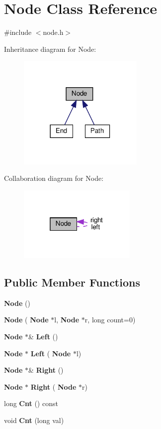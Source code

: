 \section{Node Class Reference}
\label{class_node}


{\ttfamily \#include $<$node.\+h$>$}



Inheritance diagram for Node\+:
\nopagebreak
\begin{figure}[H]
\begin{center}
\leavevmode
\includegraphics[width=170pt]{class_node__inherit__graph}
\end{center}
\end{figure}


Collaboration diagram for Node\+:
\nopagebreak
\begin{figure}[H]
\begin{center}
\leavevmode
\includegraphics[width=160pt]{class_node__coll__graph}
\end{center}
\end{figure}
\subsection*{Public Member Functions}
\begin{DoxyCompactItemize}
\item 
\textbf{ Node} ()
\item 
\textbf{ Node} (\textbf{ Node} $\ast$l, \textbf{ Node} $\ast$r, long count=0)
\item 
\textbf{ Node} $\ast$\& \textbf{ Left} ()
\item 
\textbf{ Node} $\ast$ \textbf{ Left} (\textbf{ Node} $\ast$l)
\item 
\textbf{ Node} $\ast$\& \textbf{ Right} ()
\item 
\textbf{ Node} $\ast$ \textbf{ Right} (\textbf{ Node} $\ast$r)
\item 
long \textbf{ Cnt} () const
\item 
void \textbf{ Cnt} (long val)
\end{DoxyCompactItemize}
